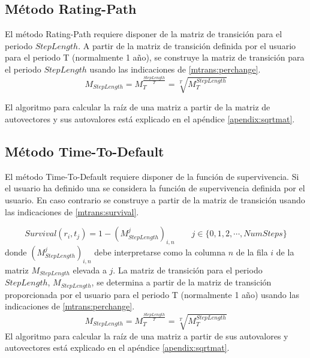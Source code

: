 \subsection{M\'etodo Rating-Path}

El m\'etodo Rating-Path requiere disponer de la matriz de transici\'on
para el periodo $StepLength$. A partir de la matriz de transici\'on
definida por el usuario para el periodo T (normalmente 1 a\~no), se
construye la matriz de transici\'on para el periodo $StepLength$ usando
las indicaciones de \ref{mtrans:perchange}.
\begin{displaymath}
M_{StepLength} = M_{T}^{\frac{StepLength}{T}} = \sqrt[T]{M_{T}^{StepLength}}
\end{displaymath}

El algoritmo para calcular la ra\'iz de una matriz a partir de la matriz
de autovectores y sus autovalores est\'a explicado en el ap\'endice
\ref{apendix:sqrtmat}.

\subsection{M\'etodo Time-To-Default}

El m\'etodo Time-To-Default requiere disponer de la funci\'on de
supervivencia. Si el usuario ha definido una se considera la
funci\'on de supervivencia definida por el usuario. En caso
contrario se construye a partir de la matriz de transici\'on
usando las indicaciones de \ref{mtrans:survival}.

\begin{displaymath}
Survival(r_i,t_j) = 1 - (M_{StepLength}^j)_{i,n} \qquad j \in \{0,1,2,\cdots,NumSteps\}
\end{displaymath}
donde $(M_{StepLength}^j)_{i,n}$ debe interpretarse como la columna $n$ de
la fila $i$ de la matriz $M_{StepLength}$ elevada a $j$. La matriz de transici\'on
para el periodo $StepLength$, $M_{StepLength}$, se determina a partir de la matriz
de transici\'on proporcionada por el usuario para el periodo T (normalmente 1 a\~no)
usando las indicaciones de \ref{mtrans:perchange}.
\begin{displaymath}
M_{StepLength} = M_{T}^{\frac{StepLength}{T}} = \sqrt[T]{M_{T}^{StepLength}}
\end{displaymath}
El algoritmo para calcular la ra\'iz de una matriz a partir de sus
autovalores y autovectores est\'a explicado en el ap\'endice
\ref{apendix:sqrtmat}.


